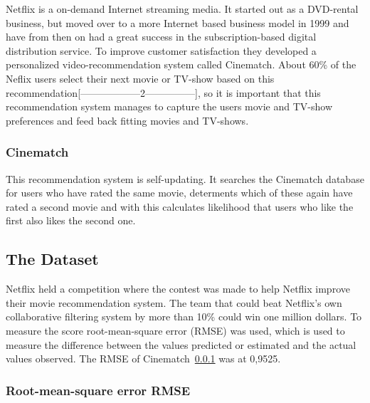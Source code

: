 Netflix is a on-demand Internet streaming media. It started out as a DVD-rental business, but moved over to a more Internet based business model in 1999 and have from then on had a great success in the subscription-based digital distribution service. To improve customer satisfaction they developed a personalized video-recommendation system called Cinematch. About 60\% of the Neflix users select their next movie or TV-show based on this recommendation[------------------2---------------], so it is important that this recommendation system manages to capture the users movie and TV-show preferences and feed back fitting movies and TV-shows.

\subsubsection{Cinematch}
\label{subsec:Cinematch}
This recommendation system is self-updating. It searches the Cinematch database for users who have rated the same movie, determents which of these again have rated a second movie and with this calculates likelihood that users who like the first also likes the second one.


\subsection{The Dataset}\label{subsec:netflixdata}

Netflix held a competition where the contest was made to help Netflix improve their movie recommendation system. The team that could beat Netflix's own collaborative filtering system by more than 10\% could win one million dollars. To measure the score root-mean-square error (RMSE) was used, which is used to measure the difference between the values predicted or estimated and the actual values observed. The RMSE of Cinematch~\ref{subsec:Cinematch} was at 0,9525.

\subsubsection{Root-mean-square error RMSE}

